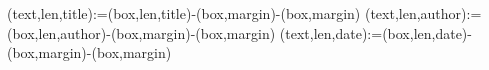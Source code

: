 




\makeatletter
\sffamily



\spine(text,len,title):={\thespine(box,len,title)-\thespine(box,margin)-\thespine(box,margin)}
\spine(text,len,author):={\thespine(box,len,author)-\thespine(box,margin)-\thespine(box,margin)}
\spine(text,len,date):={\thespine(box,len,date)-\thespine(box,margin)-\thespine(box,margin)}

\newlength{\novathesis@spinewidth}%
\setlength{\novathesis@spinewidth}{\thespine(box,margin) * (\thelastsheet+ 19) / 20}%

\newlength{\novathesis@boxwidth}
\ifdim\novathesis@spinewidth > 6mm
  \setlength{\novathesis@boxwidth}{\novathesis@spinewidth-2mm}%
\else
  \setlength{\novathesis@boxwidth}{4mm}%
\fi
\newlength{\novathesis@spinetextwidth}
\setlength{\novathesis@spinetextwidth}{\novathesis@boxwidth-\thespine(box,margin)}%

